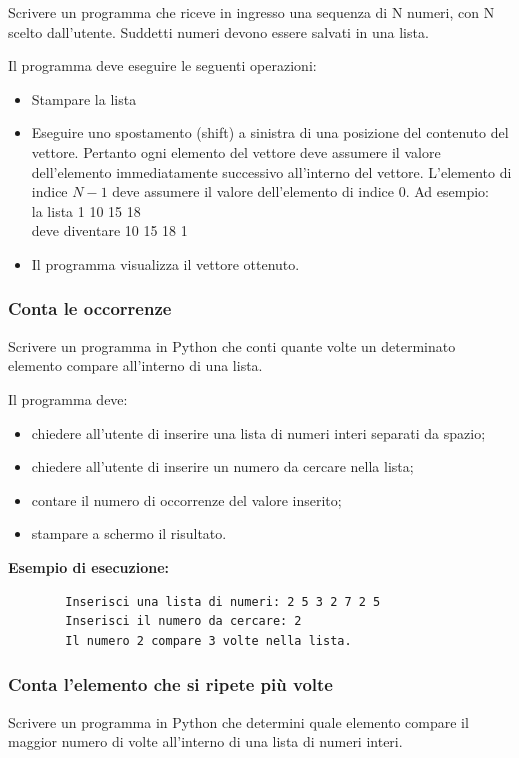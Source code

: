 \documentclass[a4paper,12pt]{article}
\begin{document}
	Scrivere un programma che riceve in ingresso una sequenza di N numeri, con N scelto dall'utente. Suddetti numeri devono essere salvati in una lista.
	
	Il programma deve eseguire le seguenti operazioni:
	
	\begin{itemize}
		\item Stampare la lista
		\item Eseguire uno spostamento (shift) a sinistra di una posizione del contenuto del vettore.
		Pertanto ogni elemento del vettore deve assumere il valore dell’elemento immediatamente successivo all’interno del vettore. L’elemento di indice $N-1$ deve assumere il
		valore dell'elemento di indice $0$.
		Ad esempio: \\ 
		la lista 1 10 15 18 \\
		deve diventare 10 15 18 1
		\item Il programma visualizza il vettore ottenuto.
	\end{itemize}
	
	
	
	\subsubsection{Conta le occorrenze}
	Scrivere un programma in Python che conti quante volte un determinato elemento compare all'interno di una lista.
	
	Il programma deve:
	\begin{itemize}
		\item chiedere all’utente di inserire una lista di numeri interi separati da spazio;
		\item chiedere all’utente di inserire un numero da cercare nella lista;
		\item contare il numero di occorrenze del valore inserito;
		\item stampare a schermo il risultato.
	\end{itemize}
	
	\textbf{Esempio di esecuzione:}
	\begin{verbatim}
		Inserisci una lista di numeri: 2 5 3 2 7 2 5
		Inserisci il numero da cercare: 2
		Il numero 2 compare 3 volte nella lista.
	\end{verbatim}
	
	\subsubsection{Conta l'elemento che si ripete più volte}
	Scrivere un programma in Python che determini quale elemento compare il maggior numero di volte all'interno di una lista di numeri interi.
	
\end{document}
